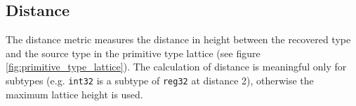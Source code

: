 
\subsection{Distance}

The distance metric measures the distance in height between the recovered type and the source type in the primitive type lattice (see figure \ref{fig:primitive_type_lattice}). The calculation of distance is meaningful only for subtypes (e.g. \texttt{int32} is a subtype of \texttt{reg32} at distance 2), otherwise the maximum lattice height is used.

